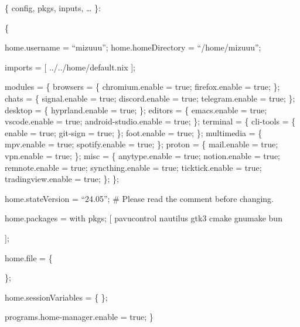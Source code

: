 \documentclass[11pt]{article}
\author{Atri Hegde}
\date{\today}
\title{}
\begin{document}
\tableofcontents

\{
  config,
  pkgs,
  inputs,
  \ldots{}
\}:

\{

home.username = ``mizuuu'';
home.homeDirectory = ``/home/mizuuu'';

imports = [ ../../home/default.nix ];

modules = \{
  browsers = \{
    chromium.enable = true;
    firefox.enable = true;
  \};
  chats = \{
    signal.enable = true;
    discord.enable = true;
    telegram.enable = true;
  \};
  desktop = \{
    hyprland.enable = true;
  \};
  editors = \{
    emacs.enable = true;
    vscode.enable = true;
    android-studio.enable = true;
  \};
  terminal = \{
    cli-tools = \{
      enable = true;
      git-sign = true;
    \};
    foot.enable = true;
  \};
  multimedia = \{
    mpv.enable = true;
    spotify.enable = true;
  \};
  proton = \{
    mail.enable = true;
    vpn.enable = true;
  \};
  misc = \{
    anytype.enable = true;
    notion.enable = true;
    remnote.enable = true;
    syncthing.enable = true;
    ticktick.enable = true;
    tradingview.enable = true;
  \};
\};

home.stateVersion = ``24.05''; \# Please read the comment before changing.

home.packages = with pkgs; [
  pavucontrol
  nautilus
  gtk3
  cmake
  gnumake
  bun

];

home.file = \{

\};

home.sessionVariables = \{ \};

  programs.home-manager.enable = true;
\}
\end{document}
